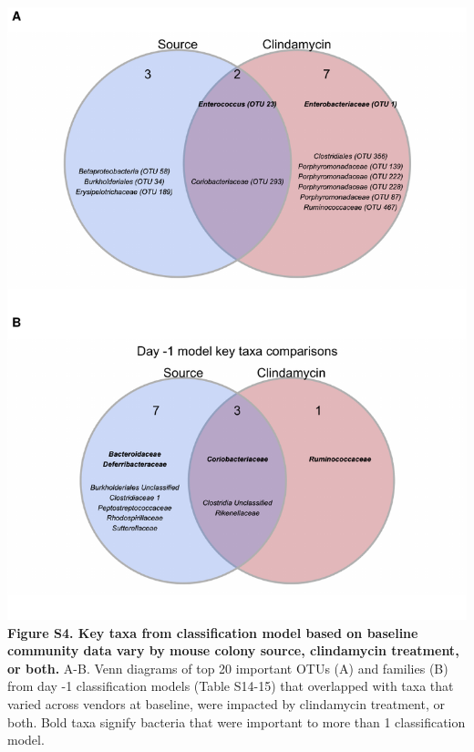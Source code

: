 \documentclass[11pt,]{article}
\begin{document}
\includegraphics{figure_S4.pdf} \textbf{Figure S4. Key taxa from
classification model based on baseline community data vary by mouse
colony source, clindamycin treatment, or both.} A-B. Venn diagrams of
top 20 important OTUs (A) and families (B) from day -1 classification
models (Table S14-15) that overlapped with taxa that varied across
vendors at baseline, were impacted by clindamycin treatment, or both.
Bold taxa signify bacteria that were important to more than 1
classification model.

\newpage
\end{document}
